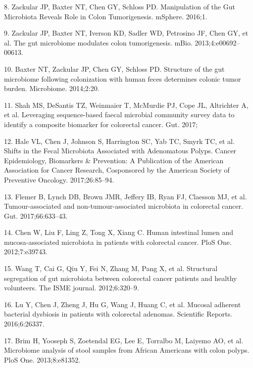 \documentclass[12pt,]{article}
\begin{document}
\hypertarget{ref-zackular_manipulation_2016}{}
8. Zackular JP, Baxter NT, Chen GY, Schloss PD. Manipulation of the Gut
Microbiota Reveals Role in Colon Tumorigenesis. mSphere. 2016;1.

\hypertarget{ref-zackular_gut_2013}{}
9. Zackular JP, Baxter NT, Iverson KD, Sadler WD, Petrosino JF, Chen GY,
et al. The gut microbiome modulates colon tumorigenesis. mBio.
2013;4:e00692--00613.

\hypertarget{ref-baxter_structure_2014}{}
10. Baxter NT, Zackular JP, Chen GY, Schloss PD. Structure of the gut
microbiome following colonization with human feces determines colonic
tumor burden. Microbiome. 2014;2:20.

\hypertarget{ref-shah_leveraging_2017}{}
11. Shah MS, DeSantis TZ, Weinmaier T, McMurdie PJ, Cope JL, Altrichter
A, et al. Leveraging sequence-based faecal microbial community survey
data to identify a composite biomarker for colorectal cancer. Gut. 2017;

\hypertarget{ref-hale_shifts_2017}{}
12. Hale VL, Chen J, Johnson S, Harrington SC, Yab TC, Smyrk TC, et al.
Shifts in the Fecal Microbiota Associated with Adenomatous Polyps.
Cancer Epidemiology, Biomarkers \& Prevention: A Publication of the
American Association for Cancer Research, Cosponsored by the American
Society of Preventive Oncology. 2017;26:85--94.

\hypertarget{ref-flemer_tumour-associated_2017}{}
13. Flemer B, Lynch DB, Brown JMR, Jeffery IB, Ryan FJ, Claesson MJ, et
al. Tumour-associated and non-tumour-associated microbiota in colorectal
cancer. Gut. 2017;66:633--43.

\hypertarget{ref-chen_human_2012}{}
14. Chen W, Liu F, Ling Z, Tong X, Xiang C. Human intestinal lumen and
mucosa-associated microbiota in patients with colorectal cancer. PloS
One. 2012;7:e39743.

\hypertarget{ref-wang_structural_2012}{}
15. Wang T, Cai G, Qiu Y, Fei N, Zhang M, Pang X, et al. Structural
segregation of gut microbiota between colorectal cancer patients and
healthy volunteers. The ISME journal. 2012;6:320--9.

\hypertarget{ref-lu_mucosal_2016}{}
16. Lu Y, Chen J, Zheng J, Hu G, Wang J, Huang C, et al. Mucosal
adherent bacterial dysbiosis in patients with colorectal adenomas.
Scientific Reports. 2016;6:26337.

\hypertarget{ref-brim_microbiome_2013}{}
17. Brim H, Yooseph S, Zoetendal EG, Lee E, Torralbo M, Laiyemo AO, et
al. Microbiome analysis of stool samples from African Americans with
colon polyps. PloS One. 2013;8:e81352.
\end{document}
